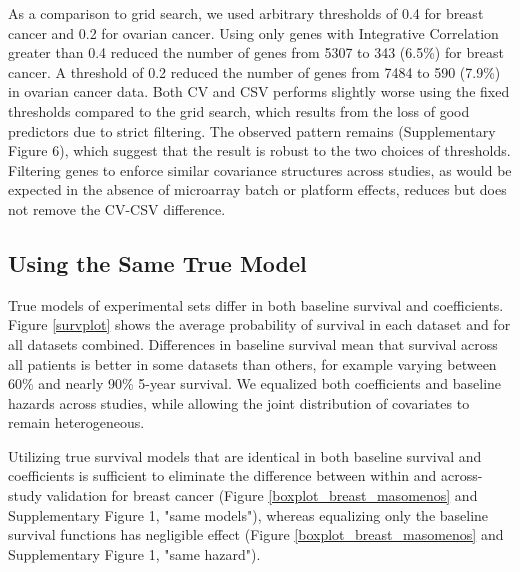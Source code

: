 \documentclass{bioinfo}
\begin{document}
  As a comparison to grid search, we used arbitrary thresholds of 0.4 for breast cancer and 0.2 for ovarian cancer. Using only genes with Integrative Correlation greater than 0.4 reduced the number of genes from 5307 to 343 (6.5\%) for breast cancer. A threshold of 0.2 reduced the number of genes 
  from 7484 to 590 (7.9\%) in ovarian cancer data. Both CV and CSV performs slightly worse using the fixed thresholds compared to the grid search, which results from the loss of good predictors due to strict filtering. The observed pattern remains (Supplementary Figure 6), which suggest that the result is robust to the two choices of thresholds. Filtering genes to enforce similar
  covariance structures across studies, as would be expected in the
  absence of microarray batch or platform effects, reduces but does not
  remove the CV-CSV difference.
  

  \subsection{Using the Same True Model}

  True models of experimental sets differ in both baseline survival and
  coefficients. Figure \ref{survplot} shows the average probability of
  survival in each dataset and for all datasets combined. Differences
  in baseline survival mean that survival across all patients is better in some
  datasets than others, for example varying between 60\% and nearly 90\% 5-year
  survival. We equalized both coefficients and baseline hazards across
  studies, while allowing the joint distribution of covariates to
  remain heterogeneous.

  Utilizing true survival models that are identical in both
  baseline survival and coefficients is sufficient to eliminate the
  difference between within and across-study validation for breast cancer
  (Figure \ref{boxplot_breast_masomenos} and Supplementary Figure 1, "same models"), whereas
  equalizing only the baseline survival functions has negligible effect
  (Figure \ref{boxplot_breast_masomenos} and Supplementary Figure 1, "same hazard").   
  
\end{document}
